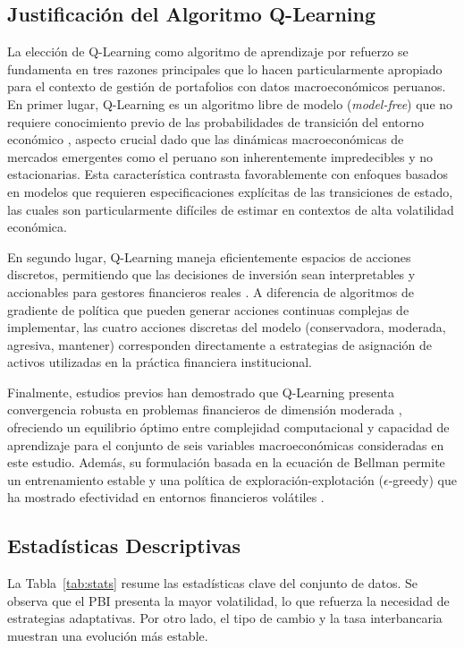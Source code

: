 \documentclass[conference]{IEEEtran}
\begin{document}
	\subsection{Justificación del Algoritmo Q-Learning}
	
	La elección de Q-Learning como algoritmo de aprendizaje por refuerzo se fundamenta en tres razones principales que lo hacen particularmente apropiado para el contexto de gestión de portafolios con datos macroeconómicos peruanos. En primer lugar, Q-Learning es un algoritmo libre de modelo (\textit{model-free}) que no requiere conocimiento previo de las probabilidades de transición del entorno económico \cite{moody2001learning}, aspecto crucial dado que las dinámicas macroeconómicas de mercados emergentes como el peruano son inherentemente impredecibles y no estacionarias. Esta característica contrasta favorablemente con enfoques basados en modelos que requieren especificaciones explícitas de las transiciones de estado, las cuales son particularmente difíciles de estimar en contextos de alta volatilidad económica.
	
	En segundo lugar, Q-Learning maneja eficientemente espacios de acciones discretos, permitiendo que las decisiones de inversión sean interpretables y accionables para gestores financieros reales \cite{li2019reinforcement}. A diferencia de algoritmos de gradiente de política que pueden generar acciones continuas complejas de implementar, las cuatro acciones discretas del modelo (conservadora, moderada, agresiva, mantener) corresponden directamente a estrategias de asignación de activos utilizadas en la práctica financiera institucional.
	
	Finalmente, estudios previos han demostrado que Q-Learning presenta convergencia robusta en problemas financieros de dimensión moderada \cite{deng2017deep, kim2019financial}, ofreciendo un equilibrio óptimo entre complejidad computacional y capacidad de aprendizaje para el conjunto de seis variables macroeconómicas consideradas en este estudio. Además, su formulación basada en la ecuación de Bellman permite un entrenamiento estable y una política de exploración-explotación ($\epsilon$-greedy) que ha mostrado efectividad en entornos financieros volátiles \cite{almahdi2017adaptive}.
	
	\subsection{Estadísticas Descriptivas}
	
	La Tabla~\ref{tab:stats} resume las estadísticas clave del conjunto de datos. Se observa que el PBI presenta la mayor volatilidad, lo que refuerza la necesidad de estrategias adaptativas. Por otro lado, el tipo de cambio y la tasa interbancaria muestran una evolución más estable.
	
\end{document}

